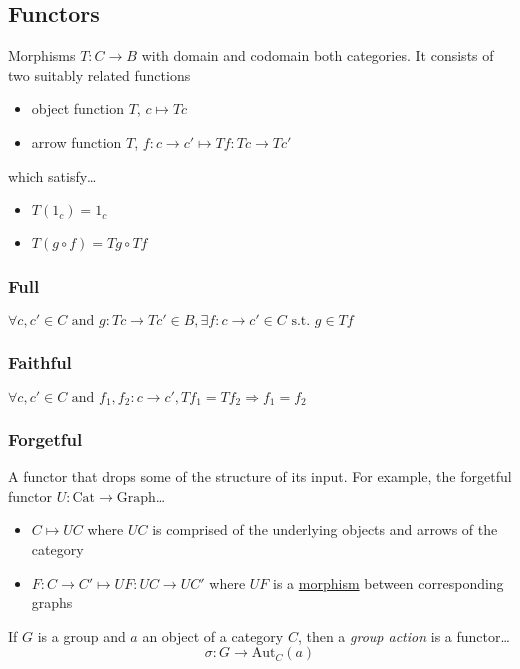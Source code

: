 \subsection{Functors}\label{functor}
Morphisms $T: C \rightarrow B$ with domain and codomain both categories. It consists of two suitably related functions
\begin{itemize}
  \item object function $T$, $c \mapsto Tc$
  \item arrow function $T$, $f:c \rightarrow c' \mapsto Tf:Tc \rightarrow Tc'$
\end{itemize}
which satisfy\dots
\begin{itemize}
  \item $T(1_c) = 1_c$
  \item $T(g \circ f) = Tg \circ Tf$
\end{itemize}

\subsubsection{Full}\label{full}
$\forall c, c' \in C \textrm{ and } g:Tc \rightarrow Tc' \in B, \exists f:c \rightarrow c' \in C \textrm{ s.t. } g \in Tf$

\subsubsection{Faithful}\label{faithful}
$\forall c, c' \in C \textrm { and } f_1,f_2:c \rightarrow c', Tf_1 = Tf_2 \Rightarrow f_1=f_2$

\subsubsection{Forgetful}\label{forgetful}
A functor that drops some of the structure of its input. For example, the forgetful functor $U: \textrm{Cat} \rightarrow \textrm{Graph}$\dots
\begin{itemize}
  \item $C \mapsto UC$ where $UC$ is comprised of the underlying objects and arrows of the category
  \item $F:C \rightarrow C' \mapsto UF:UC \rightarrow UC'$ where $UF$ is a \hyperref[graphisomorphisms]{morphism} between corresponding graphs
\end{itemize}

\label{categoricalgroupaction}
If $G$ is a group and $a$ an object of a category $C$, then a \emph{group action} is a functor\dots
$$\sigma : G \rightarrow \textrm{Aut}_C(a)$$